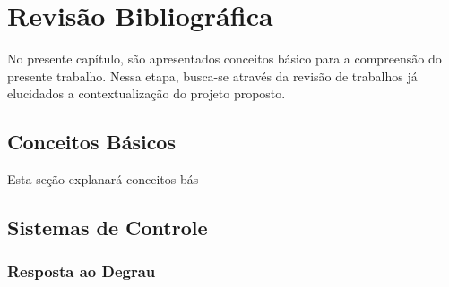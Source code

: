 \chapter{Revisão Bibliográfica}

No presente capítulo, são apresentados conceitos básico para a compreensão do presente trabalho. Nessa etapa, busca-se através da revisão de trabalhos já elucidados a contextualização do projeto proposto.

\section{Conceitos Básicos}


Esta seção explanará conceitos bás

\section{Sistemas de Controle}


\subsection{Resposta ao Degrau}


